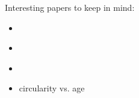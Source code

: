 \documentclass[fleqn,usenatbib]{mnras}
\newcommand{\Gaia}{\textit{Gaia}\xspace} %
\begin{document}


Interesting papers to keep in mind:
\begin{itemize}
    \item \citet{Martig2021}
    \item \citet{GarciadelaCruz2021, GarciadelaCruz2021b}
    \item \citet{Pinna2019,Pinna2019b}
    \item circularity vs. age \citet{Zhu2022}
\end{itemize}
\end{document}

